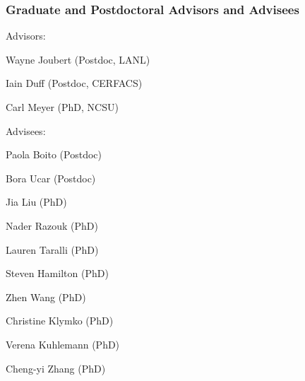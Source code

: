 \subsubsection*{Graduate and Postdoctoral Advisors and Advisees}
\vspace*{-1ex}
Advisors:
\begin{enumerate*}
\item Wayne Joubert (Postdoc, LANL)
\item Iain Duff (Postdoc, CERFACS)
\item Carl Meyer (PhD, NCSU)
\end{enumerate*} 
\vspace*{-1ex}
Advisees: 
\begin{enumerate*}
\item Paola Boito (Postdoc) 
\item Bora Ucar (Postdoc) 
\item Jia Liu (PhD)
\item Nader Razouk (PhD)
\item Lauren Taralli (PhD)
\item Steven Hamilton (PhD)
\item Zhen Wang (PhD)
\item Christine Klymko (PhD)
\item Verena Kuhlemann (PhD)
\item Cheng-yi Zhang (PhD)
\end{enumerate*}
